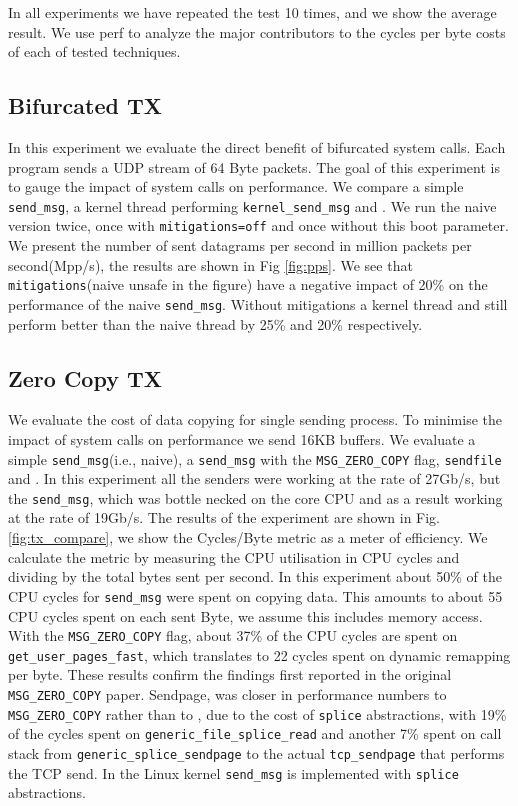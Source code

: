 In all experiments we have repeated the test 10 times, and we show the average result. We use perf\cite{perf} to analyze the major contributors to the cycles per byte costs of each of tested techniques.

\subsection{Bifurcated TX}\label{sec:eval_bif}
In this experiment we evaluate the direct benefit of bifurcated system calls. Each program sends a UDP stream of 64 Byte packets. The goal of this experiment is to gauge the impact of system calls on performance. We compare a simple \texttt{send\_msg}, a kernel thread performing \texttt{kernel\_send\_msg} and \oursys. We run the naive version twice, once with \texttt{mitigations=off}\cite{mitigations} and once without this boot parameter. We present the number of sent datagrams per second in million packets per second(Mpp/s), the results are shown in Fig \ref{fig:pps}. We see that \texttt{mitigations}(naive unsafe in the figure) have a negative impact of 20\% on the performance of the naive \texttt{send\_msg}. Without mitigations a kernel thread and \oursys still perform better than the naive thread by 25\% and 20\% respectively.

\subsection{Zero Copy TX}
We evaluate the cost of data copying for single sending process. To minimise the impact of system calls on performance we send 16KB buffers. We evaluate a simple \texttt{send\_msg}(i.e., naive), a \texttt{send\_msg} with the \texttt{MSG\_ZERO\_COPY} flag, \texttt{sendfile} and \oursys. In this experiment all the senders were working at the rate of 27Gb/s, but the \texttt{send\_msg}, which was bottle necked on the core CPU and as a result working at the rate of 19Gb/s. The results of the experiment are shown in Fig. \ref{fig:tx_compare}, we show the Cycles/Byte metric as a meter of efficiency. We calculate the metric by measuring the CPU utilisation in CPU cycles and dividing by the total bytes sent per second. In this experiment about 50\% of the CPU cycles for \texttt{send\_msg} were spent on copying data. This amounts to about 55 CPU cycles spent on each sent Byte, we assume this includes memory access. With the \texttt{MSG\_ZERO\_COPY} flag, about 37\% of the CPU cycles are spent on \texttt{get\_user\_pages\_fast}, which translates to 22 cycles spent on dynamic remapping per byte. These results confirm the findings first reported in the original \texttt{MSG\_ZERO\_COPY} paper\cite{desendmsg}. Sendpage, was closer in performance numbers to \texttt{MSG\_ZERO\_COPY} rather than to \oursys, due to the cost of \texttt{splice} abstractions, with 19\% of the cycles spent on \texttt{generic\_file\_splice\_read} and another 7\% spent on call stack from \texttt{generic\_splice\_sendpage} to the actual \texttt{tcp\_sendpage} that performs the TCP send. In the Linux kernel \texttt{send\_msg} is implemented with \texttt{splice} abstractions.

